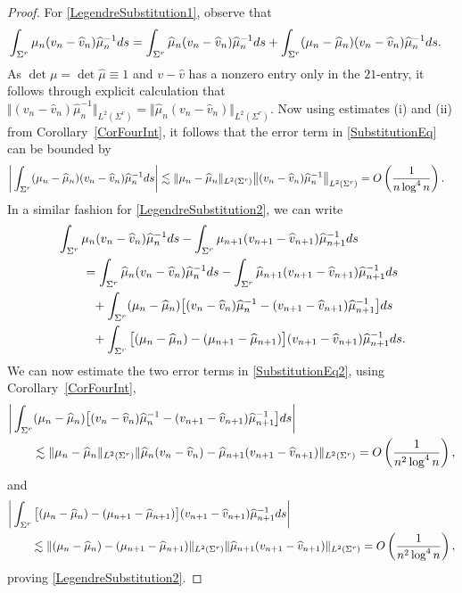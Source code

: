 \documentclass[11pt]{article}
\numberwithin{equation}{section}
\newcommand{\bmu}{{\mu}}
\newcommand{\hmu}{{\widehat \mu}}
\newcommand{\bv}{v}
\newcommand{\hv}{{\widehat v}}
\newcommand{\Sigr}{\Sigma^r}
\numberwithin{equation}{section}
\begin{document}
\begin{proof}
For \eqref{LegendreSubstitution1}, observe that
\begin{align} \label{SubstitutionEq}
 \int_{\Sigr} \bmu_n&(\bv_n-\hv_n)\hmu_n^{-1} {\rm d}s
= \int_{\Sigr} \hmu_n(\bv_n-\hv_n)\hmu_n^{-1} {\rm d}s + \int_{\Sigr} (\bmu_n-\hmu_n)(\bv_n-\hv_n)\hmu_n^{-1} {\rm d}s.
\end{align}
As $\det \bmu = \det \hmu \equiv 1$ and $\bv-\hv$ has a nonzero entry only in the $21$-entry, it follows through explicit calculation that $\Vert (\bv_n - \hv_n)\hmu_n^{-1} \Vert_{L^2(\Sigr)} =\Vert \hmu_n (\bv_n - \hv_n) \Vert_{L^2(\Sigr)}$.
Now using estimates (i) and (ii) from Corollary~\ref{CorFourInt}, it follows that the error term in \eqref{SubstitutionEq} can be bounded by
\begin{align*}
 &\bigg| \int_{\Sigr}(\bmu_n-\hmu_n)(\bv_n-\hv_n)\hmu_n^{-1} {\rm d}s\bigg|\lesssim \Vert \mu_n - \hmu_n \Vert_{L^2(\Sigr)} \big\Vert (\bv_n - \hv_n)\hmu_n^{-1} \big\Vert_{L^2(\Sigr)} = O\left(\frac{1}{n\log^4 n}\right).
\end{align*}
In a similar fashion for \eqref{LegendreSubstitution2}, we can write
\begin{align}
 &\int_{\Sigr} \bmu_n(\bv_n-\hv_n)\hmu^{-1}_n {\rm d}s - \int_{\Sigr} \bmu_{n+1}(\bv_{n+1}-\hv_{n+1})\hmu^{-1}_{n+1} {\rm d}s\nonumber
 \\
 &\qquad=\int_{\Sigr} \hmu_n(\bv_n-\hv_n)\hmu^{-1}_n {\rm d}s - \int_{\Sigr} \hmu_{n+1}(\bv_{n+1}-\hv_{n+1})\hmu^{-1}_{n+1} {\rm d}s\nonumber
 \\
 &\qquad\phantom{=}{}+ \int_{\Sigr} (\bmu_n-\hmu_n)\big[(\bv_n-\hv_n)\hmu^{-1}_n-(\bv_{n+1}-\hv_{n+1})\hmu^{-1}_{n+1}\big] {\rm d}s\nonumber
 \\
 &\qquad\phantom{=}{}+ \int_{\Sigr} \big[(\bmu_n-\hmu_n)-(\bmu_{n+1}-\hmu_{n+1})\big](\bv_{n+1}-\hv_{n+1})\hmu^{-1}_{n+1} {\rm d}s.\label{SubstitutionEq2}
\end{align}
We can now estimate the two error terms in \eqref{SubstitutionEq2}, using Corollary~\ref{CorFourInt},
\begin{align*}
 &\bigg|\int_{\Sigr} (\bmu_n-\hmu_n)\big[(\bv_n-\hv_n)\hmu^{-1}_n-(\bv_{n+1}-\hv_{n+1})\hmu^{-1}_{n+1}\big] {\rm d}s\bigg|
 \\
 &\qquad\lesssim \Vert \mu_n - \hmu_n \Vert_{L^2(\Sigr)} \Vert \hmu_n (\bv_n - \hv_n) - \hmu_{n+1} (\bv_{n+1} - \hv_{n+1}) \Vert_{L^2(\Sigr)} = O\left(\frac{1}{n^{2}\log^4 n}\right),
\end{align*}
and
\begin{align*}
 &\bigg| \int_{\Sigr} \big[(\bmu_n-\hmu_n)-(\bmu_{n+1}-\hmu_{n+1})\big](\bv_{n+1}-\hv_{n+1})\hmu^{-1}_{n+1} {\rm d}s \bigg|
 \\
 &\qquad\lesssim \Vert (\mu_n - \hmu_n) - (\mu_{n+1} - \hmu_{n+1}) \Vert_{L^2(\Sigr)} \Vert \hmu_{n+1} (\bv_{n+1} - \hv_{n+1}) \Vert_{L^2(\Sigr)} = O\left(\frac{1}{n^{2}\log^4 n}\right),
\end{align*}
proving \eqref{LegendreSubstitution2}.
\end{proof}
\end{document}
